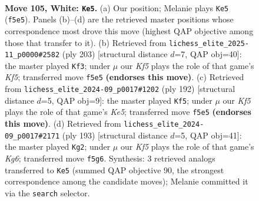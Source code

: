 \documentclass[11pt]{article}
\begin{document}
\clearpage

\begin{figure}[p]\centering
\begin{subfigure}{0.46\textwidth}\centering
\resizebox{\linewidth}{!}{%
\newchessgame
\chessboard[
  setfen={8/4k3/8/5K2/8/1N6/2R3Pr/8 w - - 74 105},
  showmover=false,
  pgfstyle=straightmove, color=movearrow, markmove={f5-e5}
]}
\caption{}
\end{subfigure}\hfill
\begin{subfigure}{0.46\textwidth}\centering
\resizebox{\linewidth}{!}{%
\newchessgame
\chessboard[
  setfen={8/8/3K4/8/5k1r/8/7p/7R b - - 1 102},
  showmover=false,
  pgfstyle=straightmove, color=movearrow, markmove={f4-f3}
]}
\caption{}
\end{subfigure}
\\[4pt]
\begin{subfigure}{0.46\textwidth}\centering
\resizebox{\linewidth}{!}{%
\newchessgame
\chessboard[
  setfen={5k2/2R4P/8/4K3/7r/8/8/8 w - - 23 97},
  showmover=false,
  pgfstyle=straightmove, color=movearrow, markmove={e5-f5}
]}
\caption{}
\end{subfigure}\hfill
\begin{subfigure}{0.46\textwidth}\centering
\resizebox{\linewidth}{!}{%
\newchessgame
\chessboard[
  setfen={8/8/8/7r/2K5/6k1/7p/7R b - - 3 97},
  showmover=false,
  pgfstyle=straightmove, color=movearrow, markmove={g3-g2}
]}
\caption{}
\end{subfigure}
\caption{\textbf{Move 105, White: \texttt{Ke5}.} (a) Our position; Melanie plays \texttt{Ke5} (\texttt{f5e5}). Panels (b)--(d) are the retrieved master positions whose correspondence most drove this move (highest QAP objective among those that transfer to it). (b) Retrieved from \texttt{lichess\_elite\_2025-11\_p0000\#2582} (ply 203) [structural distance $d$=7, QAP obj=40]: the master played \texttt{Kf3}; under $\mu$ our \emph{Kf5} plays the role of that game's \emph{Kf5}; transferred move \texttt{f5e5} \textbf{(endorses this move)}. (c) Retrieved from \texttt{lichess\_elite\_2024-09\_p0017\#1202} (ply 192) [structural distance $d$=5, QAP obj=9]: the master played \texttt{Kf5}; under $\mu$ our \emph{Kf5} plays the role of that game's \emph{Ke5}; transferred move \texttt{f5e5} \textbf{(endorses this move)}. (d) Retrieved from \texttt{lichess\_elite\_2024-09\_p0017\#2171} (ply 193) [structural distance $d$=5, QAP obj=41]: the master played \texttt{Kg2}; under $\mu$ our \emph{Kf5} plays the role of that game's \emph{Kg6}; transferred move \texttt{f5g6}. Synthesis: 3 retrieved analogs transferred to \texttt{Ke5} (summed QAP objective 90, the strongest correspondence among the candidate moves); Melanie committed it via the \texttt{search} selector.}
\label{fig:thought-m208}
\end{figure}
\end{document}
